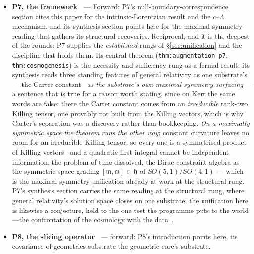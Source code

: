 \documentclass[11pt,a4paper]{article}
\theoremstyle{definition}
\begin{document}
\begin{itemize}
the load-bearing one, the modal fallacy, and the constructive ordering
(ontology from evidence). The unification of
\S\ref{sec:unification} is a structure the programme's rules favour, and reading its several
established rungs as one fact is a theory-choice, decidable by the test of
\S\ref{sec:frontiers}
as the discipline's first programme.
\item \textbf{P7, the framework~\cite{JanzenCRframework}} --- Forward: P7's null-boundary-correspondence section cites this paper for the
intrinsic-Lorentzian result and the $c$--$\Lambda$ mechanism, and its synthesis section
points here for the maximal-symmetry reading that gathers its structural
recoveries. Reciprocal, and it is the deepest of the rounds: P7 supplies the
\emph{established} rungs of \S\ref{sec:unification} and the discipline that
holds them. Its central theorem (\texttt{thm:augmentation-p7},
\texttt{thm:cosmogenesis}) is the necessity-and-sufficiency rung as a formal
result; its synthesis reads three standing features of general relativity as
one substrate's --- the Carter constant~\cite{Carter1968} \emph{as the substrate's own maximal
symmetry surfacing}---a sentence that is true for a reason worth stating, since on Kerr the same words are false: there the Carter constant comes from an \emph{irreducible} rank-two Killing tensor, one provably not built from the Killing vectors, which is why Carter's separation was a discovery rather than bookkeeping. \emph{On a maximally symmetric space the theorem runs the other way}: constant curvature leaves no room for an irreducible Killing tensor, so every one is a symmetrised product of Killing vectors~\cite{Thompson1986} and a quadratic first integral cannot be independent information, the problem of time dissolved, the Dirac constraint
algebra as the symmetric-space grading $[\mathfrak{m},\mathfrak{m}]\subset
\mathfrak{h}$ of $SO(5,1)/SO(4,1)$ --- which is the maximal-symmetry
unification already at work at the structural rung. P7's synthesis section carries the same
reading at the structural rung, where general relativity's solution space
closes on one substrate; the unification here is likewise a conjecture, held to
the one test the programme puts to the world---the confrontation of the
cosmology with the data~\cite{JanzenCRcosmology}.
\item \textbf{P8, the slicing operator~\cite{JanzenOperator}} --- forward: P8's introduction points here, its
covariance-of-geometries substrate the geometric core's substrate.

\end{itemize}
\end{document}
